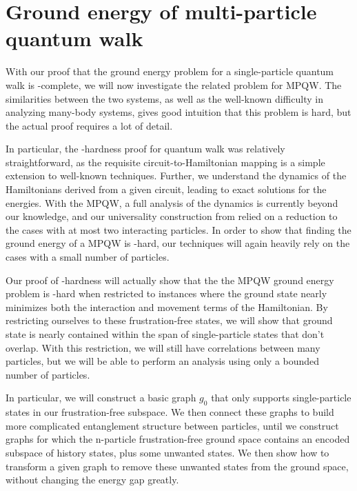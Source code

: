 \documentclass[../thesis-main/thesis-main]{subfiles}
\begin{document}
\chapter{Ground energy of multi-particle quantum walk}
\label{chap:MP_ground}



With our proof that the ground energy problem for a single-particle quantum walk is \QMA-complete, we will now investigate the related problem for MPQW.  The similarities between the two systems, as well as the well-known difficulty in analyzing many-body systems, gives good intuition that this problem is hard, but the actual proof requires a lot of detail.

In particular, the \QMA-hardness proof for quantum walk was relatively straightforward, as the requisite circuit-to-Hamiltonian mapping is a simple extension to well-known techniques.  Further, we understand the dynamics of the Hamiltonians derived from a given circuit, leading to exact solutions for the energies.  With the MPQW, a full analysis of the dynamics is currently beyond our knowledge, and our universality construction from  relied on a reduction to the cases with at most two interacting particles.  In order to show that finding the ground energy of a MPQW is \QMA-hard, our techniques will again heavily rely on the cases with a small number of particles.

Our proof of \QMA-hardness will actually show that the the MPQW ground energy problem is \QMA-hard when restricted to instances where the ground state nearly minimizes both the interaction and movement terms of the Hamiltonian.  By restricting ourselves to these frustration-free states, we will show that ground state is nearly contained within the span of single-particle states that don't overlap.  With this restriction, we will still have correlations between many particles, but we will be able to perform an analysis using only a bounded number of particles.  

In particular, we will construct a basic graph $g_0$ that only supports single-particle states in our frustration-free subspace.  We then connect these graphs to build more complicated entanglement structure between particles, until we construct graphs for which the n-particle frustration-free ground space contains an encoded subspace of history states, plus some unwanted states.  We then show how to transform a given graph to remove these unwanted states from the ground space, without changing the energy gap greatly.
\end{document}
